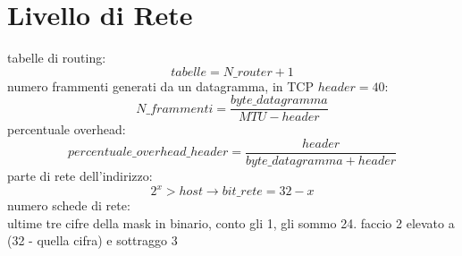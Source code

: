 \documentclass[a4paper,12pt, oneside]{book}
\begin{document}
\section{Livello di Rete}
tabelle di routing:
$$tabelle=N\_router+1$$
numero frammenti generati da un datagramma, in TCP $header=40$:
$$N\_frammenti=\frac{byte\_datagramma}{MTU-header}$$
percentuale overhead:
$$percentuale\_overhead\_header=\frac{header}{byte\_datagramma+header}$$
parte di rete dell'indirizzo:
$$2^x>host\to bit\_rete=32-x$$
numero schede di rete:
\\ ultime tre cifre della mask in binario, conto gli 1, gli sommo 24. faccio 2 elevato a (32 - quella cifra) e sottraggo 3
\end{document}
